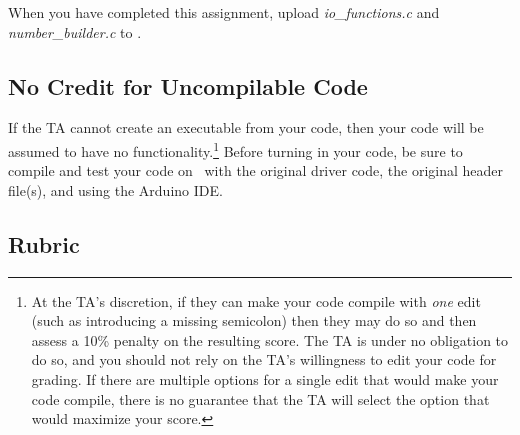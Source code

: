 When you have completed this assignment, upload \textit{io\_functions.c} and \textit{number\_builder.c} to
\filesubmission.

\subsection*{No Credit for Uncompilable Code}
If the TA cannot create an executable from your code, then your code will be assumed to have no functionality.\footnote{
    At the TA's discretion, if they can make your code compile with \textit{one} edit (such as introducing a missing semicolon) then they may do so and then assess a 10\% penalty on the resulting score.
    The TA is under no obligation to do so, and you should not rely on the TA's willingness to edit your code for grading.
    If there are multiple options for a single edit that would make your code compile, there is no guarantee that the TA will select the option that would maximize your score.
}
Before turning in your code, be sure to compile and test your code on \runtimeenvironment\ with the original driver code, the original header file(s), and using the Arduino IDE.

\floatlablatepolicy

\subsection*{Rubric}

